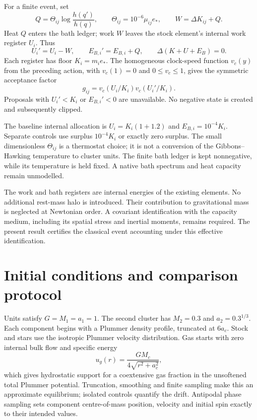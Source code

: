 \documentclass[11pt]{article}
\begin{document}
For a finite event, set
\begin{equation}
 Q=\Theta_{ij}\log\frac{h(q')}{h(q)},\qquad
 \Theta_{ij}=10^{-6}\mu_{ij}e_*,\qquad
 W=\Delta K_{ij}+Q.
\end{equation}
Heat $Q$ enters the bath ledger; work $W$ leaves the stock element's internal
work register $U_i$. Thus
\begin{equation}\label{eq:ledger}
 U_i'=U_i-W,\qquad E_{B,i}'=E_{B,i}+Q,\qquad
 \Delta(K+U+E_B)=0.
\end{equation}
Each register has floor $K_i=m_i e_*$. The homogeneous clock-speed function
$v_c(y)$ from the preceding action, with $v_c(1)=0$ and $0\le v_c\le1$,
gives the symmetric acceptance factor
\begin{equation}\label{eq:gate}
 g_{ij}=v_c(U_i/K_i)v_c(U_i'/K_i).
\end{equation}
Proposals with $U_i'<K_i$ or $E_{B,i}'<0$ are unavailable. No negative
state is created and subsequently clipped.

The baseline internal allocation is $U_i=K_i(1+1.2)$ and
$E_{B,i}=10^{-4}K_i$. Separate controls use surplus $10^{-4}K_i$ or exactly
zero surplus. The small dimensionless $\Theta_{ij}$ is a thermostat choice;
it is not a conversion of the Gibbons--Hawking temperature to cluster units.
The finite bath ledger is kept nonnegative, while its temperature is held
fixed. A native bath spectrum and heat capacity remain unmodelled.

The work and bath registers are internal energies of the existing elements.
No additional rest-mass halo is introduced. Their contribution to gravitational
mass is neglected at Newtonian order. A covariant identification with the
capacity medium, including its spatial stress and inertial moments, remains
required. The present result certifies the classical event accounting under
this effective identification.

\section{Initial conditions and comparison protocol}
Units satisfy $G=M_1=a_1=1$. The second cluster has $M_2=0.3$ and
$a_2=0.3^{1/3}$. Each component begins with a Plummer density profile,
truncated at $6a_c$. Stock and stars use the isotropic Plummer velocity
distribution. Gas starts with zero internal bulk flow and specific energy
\begin{equation}
 u_g(r)=\frac{GM_c}{4\sqrt{r^2+a_c^2}},
\end{equation}
which gives hydrostatic support for a coextensive gas fraction in the
unsoftened total Plummer potential. Truncation, smoothing and finite sampling
make this an approximate equilibrium; isolated controls quantify the drift.
Antipodal phase sampling sets component centre-of-mass position, velocity
and initial spin exactly to their intended values.
\end{document}
